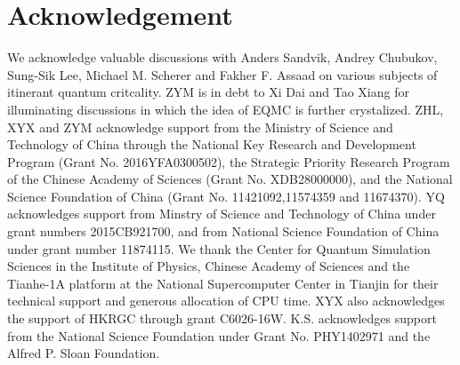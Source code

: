 \documentclass[aps,prx,twocolumn,superscriptaddress,showpacs,floatfix]{revtex4-1}
\begin{document}

\section{Acknowledgement}
We acknowledge valuable discussions with Anders Sandvik, Andrey Chubukov, Sung-Sik Lee, Michael M. Scherer and Fakher F. Assaad on various subjects of itinerant quantum critcality. ZYM is in debt to Xi Dai and Tao Xiang for illuminating discussions in which the idea of EQMC is further crystalized. ZHL, XYX and ZYM acknowledge support from the Ministry of Science and Technology of China through the National Key Research and Development Program (Grant No. 2016YFA0300502), the Strategic Priority Research Program of the Chinese
Academy of Sciences (Grant No. XDB28000000), and the National Science Foundation of China (Grant No. 11421092,11574359 and 11674370). YQ acknowledges support from Minstry of Science and Technology of China under grant numbers 2015CB921700, and from National Science Foundation of China under grant number 11874115. We thank the Center for Quantum Simulation Sciences in the Institute of Physics, Chinese Academy of Sciences and the Tianhe-1A platform at the National Supercomputer Center in Tianjin for their technical support and generous allocation of CPU time. XYX also acknowledges the support of HKRGC through grant C6026-16W. K.S. acknowledges support from the National Science Foundation under Grant No. PHY1402971 and the Alfred P. Sloan Foundation.


\end{document}
